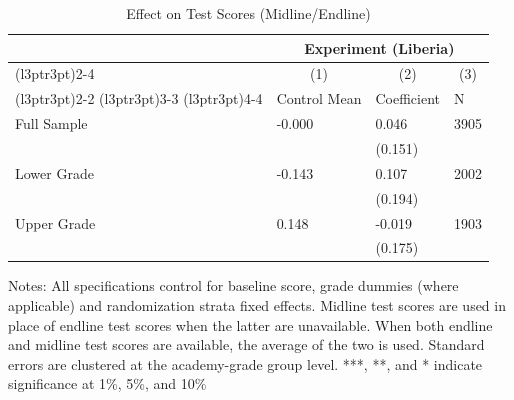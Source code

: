 \begin{table}[!h]
\centering
\caption{Effect on Test Scores (Midline/Endline)}
\centering
\begin{threeparttable}
\begin{tabular}[t]{llll}
\toprule
\multicolumn{1}{c}{ } & \multicolumn{3}{c}{Experiment (Liberia)} \\
\cmidrule(l{3pt}r{3pt}){2-4}
\multicolumn{1}{c}{ } & \multicolumn{1}{c}{(1)} & \multicolumn{1}{c}{(2)} & \multicolumn{1}{c}{(3)} \\
\cmidrule(l{3pt}r{3pt}){2-2} \cmidrule(l{3pt}r{3pt}){3-3} \cmidrule(l{3pt}r{3pt}){4-4}
 & Control Mean & Coefficient & N\\
\midrule
Full Sample & -0.000 & 0.046 & 3905\\
 &  & (0.151) & \\
Lower Grade & -0.143 & 0.107 & 2002\\
 &  & (0.194) & \\
Upper Grade & 0.148 & -0.019 & 1903\\
 &  & (0.175) & \\
\bottomrule
\end{tabular}
\begin{tablenotes}[para]
\item Notes: All specifications control for baseline score, grade dummies (where applicable) and randomization strata fixed effects. Midline test scores are used in place of endline test scores when the latter are unavailable. When both endline and midline test scores are available, the average of the two is used. Standard errors are clustered at the academy-grade group level. ***, **, and * indicate significance at 1\%, 5\%, and 10\%
\end{tablenotes}
\end{threeparttable}
\end{table}

